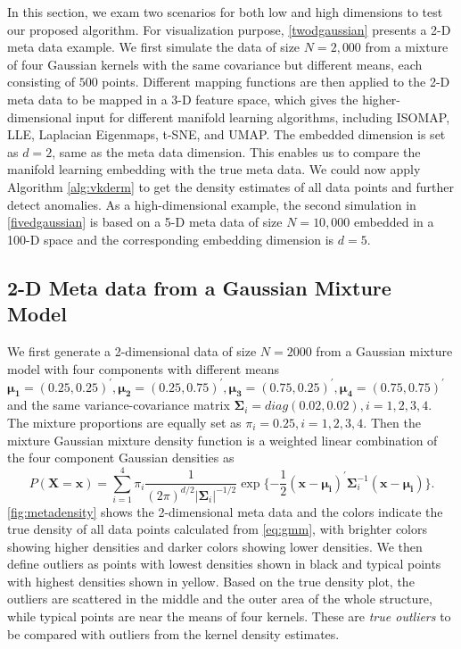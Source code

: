 \documentclass[11pt,a4paper,]{article}
\begin{document}
In this section, we exam two scenarios for both low and high dimensions to test our proposed algorithm. For visualization purpose, \autoref{twodgaussian} presents a 2-D meta data example. We first simulate the data of size \(N=2,000\) from a mixture of four Gaussian kernels with the same covariance but different means, each consisting of \(500\) points. Different mapping functions are then applied to the 2-D meta data to be mapped in a 3-D feature space, which gives the higher-dimensional input for different manifold learning algorithms, including ISOMAP, LLE, Laplacian Eigenmaps, t-SNE, and UMAP. The embedded dimension is set as \(d=2\), same as the meta data dimension. This enables us to compare the manifold learning embedding with the true meta data. We could now apply Algorithm \ref{alg:vkderm} to get the density estimates of all data points and further detect anomalies. As a high-dimensional example, the second simulation in \autoref{fivedgaussian} is based on a 5-D meta data of size \(N=10,000\) embedded in a 100-D space and the corresponding embedding dimension is \(d=5\).

\hypertarget{twodgaussian}{%
\subsection{2-D Meta data from a Gaussian Mixture Model}\label{twodgaussian}}

We first generate a 2-dimensional data of size \(N=2000\) from a Gaussian mixture model with four components with different means \(\pmb{\mu_1}=(0.25, 0.25)^\prime, \pmb{\mu_2}=(0.25, 0.75)^\prime, \pmb{\mu_3}=(0.75, 0.25)^\prime, \pmb{\mu_4}=(0.75, 0.75)^\prime\) and the same variance-covariance matrix \(\pmb{\Sigma}_i=diag(0.02, 0.02), i=1,2,3,4\). The mixture proportions are equally set as \(\pi_i=0.25, i=1,2,3,4\).
Then the mixture Gaussian mixture density function is a weighted linear combination of the four component Gaussian densities as
\begin{equation}
\label{eq:gmm}
P(\pmb{X}=\pmb{x}) = \sum_{i=1}^{4}\pi_i \frac{1}{(2\pi)^{d/2}|\pmb{\Sigma}_i|^{-1/2}} \exp{\{-\frac{1}{2} (\pmb{x}-\pmb{\mu_i})^\prime \pmb{\Sigma}_i^{-1} (\pmb{x}-\pmb{\mu_i}) \}}.
\end{equation}
\autoref{fig:metadensity} shows the 2-dimensional meta data and the colors indicate the true density of all data points calculated from \eqref{eq:gmm}, with brighter colors showing higher densities and darker colors showing lower densities. We then define outliers as points with lowest densities shown in black and typical points with highest densities shown in yellow. Based on the true density plot, the outliers are scattered in the middle and the outer area of the whole structure, while typical points are near the means of four kernels. These are \emph{true outliers} to be compared with outliers from the kernel density estimates.
\end{document}
